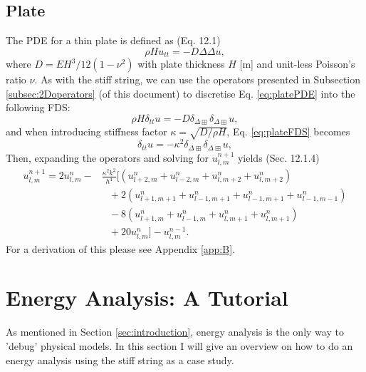 \documentclass{article}
\begin{document}
\subsection{Plate}
The PDE for a thin plate is defined as (Eq. 12.1)
\begin{equation}\label{eq:platePDE}
    \rho H u_{tt} = -D\Delta\Delta u,
\end{equation}
where $D = EH^3/12(1-\nu^2)$ with plate thickness $H$ [m] and unit-less Poisson's ratio $\nu$. As with the stiff string, we can use the operators presented in Subsection \ref{subsec:2Doperators} (of this document) to discretise Eq. \eqref{eq:platePDE} into the following FDS: 
\begin{equation}\label{eq:plateFDS}
    \rho H \delta_{tt}u = -D\delta_{\Delta\boxplus}\delta_{\Delta\boxplus} u,
\end{equation}
and when introducing stiffness factor $\kappa =\sqrt{D/\rho H}$, Eq. \eqref{eq:plateFDS} becomes
\begin{equation}\label{eq:plateFDS}
    \delta_{tt}u = -\kappa^2\delta_{\Delta\boxplus}\delta_{\Delta\boxplus} u,
\end{equation}
Then, expanding the operators and solving for $u_{l,m}^{n+1}$ yields (Sec. 12.1.4)
\begin{equation}
    \begin{aligned}
    u_{l,m}^{n+1} = 2u_{l,m}^n-&\frac{\kappa^2k^2}{h^4} \big[(u_{l+2, m}^n + u_{l-2, m}^n+u_{l, m+2}^n+u_{l, m+2}^n)\\
    & \ \ \; +2(u_{l+1, m+1}^n + u_{l-1, m+1}^n+u_{l-1, m+1}^n+u_{l-1, m-1}^n)\\
    & \ \ \; -8(u_{l+1, m}^n + u_{l-1, m}^n+u_{l, m+1}^n+u_{l, m+1}^n)\\
    & \ \ \; +20u_{l,m}^n\big]- u_{l,m}^{n-1}.
    \end{aligned}
\end{equation}
For a derivation of this please see Appendix \ref{app:B}. 
\section{Energy Analysis: A Tutorial}\label{sec:energy}
As mentioned in Section \ref{sec:introduction}, energy analysis is the only way to 'debug' physical models. In this section I will give an overview on how to do an energy analysis using the stiff string as a case study. 
\end{document}
